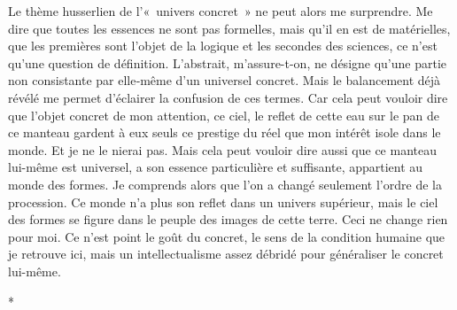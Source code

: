 \documentclass{book}
\begin{document}
Le thème husserlien de l'« univers concret » ne peut alors me surprendre. Me dire que toutes les essences ne sont pas formelles, mais qu'il en est de matérielles, que les premières sont l'objet de la logique et les secondes des sciences, ce n'est qu'une question de définition. L'abstrait, m'assure-t-on, ne désigne qu'une partie non consistante par elle‑même d'un universel concret. Mais le balancement déjà révélé me permet d'éclairer la confusion de ces termes. Car cela peut vouloir dire que l'objet concret de mon attention, ce ciel, le reflet de cette eau sur le pan de ce manteau gardent à eux seuls ce prestige du réel que mon intérêt isole dans le monde. Et je ne le nierai pas. Mais cela peut vouloir dire aussi que ce manteau lui-même est universel, a son essence particulière et suffisante, appartient au monde des formes. Je comprends alors que l'on a changé seulement l'ordre de la procession. Ce monde n'a plus son reflet dans un univers supérieur, mais le ciel des formes se figure dans le peuple des images de cette terre. Ceci ne change rien pour moi. Ce n'est point le goût du concret, le sens de la condition humaine que je retrouve ici, mais un intellectualisme assez débridé pour généraliser le concret lui-même.

\begin{center}
*
\end{center}
\end{document}
